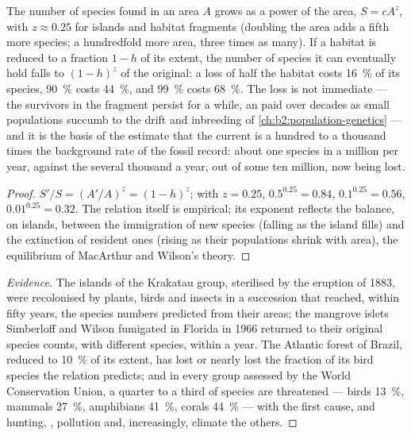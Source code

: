 \begin{theorem}\label{thm:b2:global-change:sar}
The number of species found in an area $A$ grows as a power of the
area, $S = cA^{z}$, with $z \approx 0.25$ for islands and habitat
fragments (doubling the area adds a fifth more species; a
hundredfold more area, three times as many). If a habitat is
reduced to a fraction $1 - h$ of its extent, the number of species
it can eventually hold falls to $(1 - h)^{z}$ of the original: a
loss of half the habitat costs \qty{16}{\%} of its species,
\qty{90}{\%} costs \qty{44}{\%}, and \qty{99}{\%} costs
\qty{68}{\%}. The loss is not immediate --- the survivors in the
fragment persist for a while, an \emph{} paid over
decades as small populations succumb to the drift and inbreeding of
\cref{ch:b2:population-genetics} --- and it is the basis of the
estimate that the current  is a hundred to a
thousand times the background rate of the fossil record: about
one species in a million per year, against the several thousand a
year, out of some ten million, now being lost.
\end{theorem}
\begin{proof}
$S'/S = (A'/A)^{z} = (1 - h)^{z}$; with $z = 0.25$, $0.5^{0.25} =
0.84$, $0.1^{0.25} = 0.56$, $0.01^{0.25} = 0.32$. The relation
itself is empirical; its exponent reflects the balance, on islands,
between the immigration of new species (falling as the island
fills) and the extinction of resident ones (rising as their
populations shrink with area), the equilibrium of MacArthur and
Wilson's theory.
\end{proof}
\begin{proof}[Evidence]
The islands of the Krakatau group, sterilised by the eruption of
1883, were recolonised by plants, birds and insects in a
succession that reached, within fifty years, the species numbers
predicted from their areas; the mangrove islets Simberloff and
Wilson fumigated in Florida in 1966 returned to their original
species counts, with different species, within a year. The Atlantic
forest of Brazil, reduced to \qty{10}{\%} of its extent, has lost
or nearly lost the fraction of its bird species the relation
predicts; and in every group assessed by the World Conservation
Union, a quarter to a third of species are threatened --- birds
\qty{13}{\%}, mammals \qty{27}{\%}, amphibians \qty{41}{\%}, corals
\qty{44}{\%} --- with  the first cause, and hunting,
, pollution and, increasingly, climate the others.
\end{proof}

